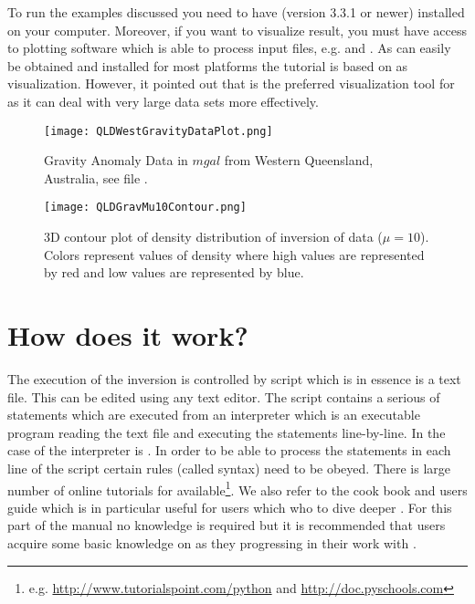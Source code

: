 To run the examples discussed you need to have \escript (version 3.3.1 or newer) installed on your computer.
Moreover, if you want to visualize result, you must have access to plotting software which is able to process
\VTK input files, e.g. \mayavi and \VisIt. As \mayavi can easily be obtained and installed for most platforms
the tutorial is based on \mayavi as visualization. However, it pointed out 
that \VisIt is the preferred visualization tool for \escript as it can deal with very large data sets more effectively.
    
\begin{figure}
\centering
\texttt{[image: QLDWestGravityDataPlot.png]}
\caption{Gravity Anomaly Data in $mgal$ from Western Queensland, Australia, see file .
 }
\label{FIG:P1:GRAV:0}
\end{figure}

\begin{figure}
\centering
\texttt{[image: QLDGravMu10Contour.png]}
\caption{3D contour plot of density distribution of inversion of data  ($\mu=10$). Colors
represent values of density where high values are represented by red and low values are represented by blue.
 }
\label{FIG:P1:GRAV:1}
\end{figure}

\section{How does it work?}
The execution of the inversion is controlled by script which is in essence is a text file. This can be edited using any 
text editor. The script contains a serious of statements which are executed from an interpreter which
is an executable program reading the text file and executing the statements line-by-line. In the case 
of \downunder the interpreter is \python. In order to be able to process the statements in each line of the script
certain rules (called syntax) need to be obeyed. There is large number of online tutorials for \python 
available\footnote{e.g. \url{http://www.tutorialspoint.com/python} and \url{http://doc.pyschools.com}}. We also 
refer to the \escript cook book \cite{ESCRIPTCOOKBOOK} and users guide \cite{ESCRIPT} which is in particular useful for users which who to dive deeper
\downunder. For this part of the manual no \python knowledge is required but it is recommended that 
users acquire some basic knowledge on \python as they progressing in their work with \downunder.

